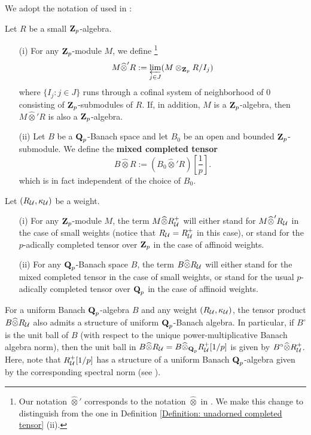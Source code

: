 We adopt the notation of  used in \cite{CHJ-2017}:

\begin{Definition}\label{Definition: unadorned completed tensor}
Let $R$ be a small $\operatorname{\mathbf{Z}}_p$-algebra.
\begin{enumerate}
\item[(i)] For any $\operatorname{\mathbf{Z}}_p$-module $M$, we define \footnote{Our notation $\widehat{\otimes}'$ corresponds to the notation $\widehat{\otimes}$ in \cite[Definition 6.3]{CHJ-2017}. We make this change to distinguish from the one in Definition \ref{Definition: unadorned completed tensor} (ii).}
$$M\widehat{\otimes}' R:=\varprojlim _{j\in J} (M\otimes_{\operatorname{\mathbf{Z}}_p}R/I_j)$$
where $\{I_j: j\in J\}$ runs through a cofinal system of neighborhood of $0$ consisting of $\operatorname{\mathbf{Z}}_p$-submodules of $R$. If, in addition, $M$ is a $\operatorname{\mathbf{Z}}_p$-algebra, then $M\widehat{\otimes}' R$ is also a $\operatorname{\mathbf{Z}}_p$-algebra.
\item[(ii)] Let $B$ be a $\operatorname{\mathbf{Q}}_p$-Banach space and let $B_0$ be an open and bounded $\operatorname{\mathbf{Z}}_p$-submodule. We define the \textbf{mixed completed tensor}
$$B\widehat{\otimes}R:=(B_0\widehat{\otimes}'R)[\frac{1}{p}].$$
which is in fact independent of the choice of $B_0$. 
\end{enumerate}
\end{Definition}

\begin{Definition}\label{Definition: mixed completed tensor}
Let $(R_{\operatorname{\mathcal{U}}}, \kappa_{\operatorname{\mathcal{U}}})$ be a weight.
\begin{enumerate}
\item[(i)] For any $\operatorname{\mathbf{Z}}_p$-module $M$, the term $M\widehat{\otimes}R^+_{\operatorname{\mathcal{U}}}$ will either stand for $M\widehat{\otimes}' R_{\operatorname{\mathcal{U}}}$ in the case of small weights (notice that $R_{\operatorname{\mathcal{U}}}=R^+_{\operatorname{\mathcal{U}}}$ in this case), or stand for the $p$-adically completed tensor over $\operatorname{\mathbf{Z}}_p$ in the case of affinoid weights.
\item[(ii)]
For any $\operatorname{\mathbf{Q}}_p$-Banach space $B$, the term $B\widehat{\otimes} R_{\operatorname{\mathcal{U}}}$ will either stand for the mixed completed tensor in the case of small weights, or stand for the usual $p$-adically completed tensor over $\operatorname{\mathbf{Q}}_p$ in the case of affinoid weights. 
\end{enumerate}
\end{Definition}

\begin{Remark}\label{Remark: uniform Banach algebra structure 1}\normalfont 
For a uniform Banach $\operatorname{\mathbf{Q}}_p$-algebra $B$ and any weight $(R_{\operatorname{\mathcal{U}}}, \kappa_{\operatorname{\mathcal{U}}})$, the tensor product $B\widehat{\otimes}R_{\operatorname{\mathcal{U}}}$ also admits a structure of uniform $\operatorname{\mathbf{Q}}_p$-Banach algebra. In particular,
if $B^{\circ}$ is the unit ball of $B$ (with respect to the unique power-multiplicative Banach algebra norm), then the unit ball in $B\widehat{\otimes}R_{\operatorname{\mathcal{U}}} = B\widehat{\otimes}_{\operatorname{\mathbf{Q}}_p}R_{\operatorname{\mathcal{U}}}^+[1/p]$ is given by $B^{\circ}\widehat{\otimes} R^+_{\operatorname{\mathcal{U}}}$. Here, note that $R_{\operatorname{\mathcal{U}}}^+[1/p]$ has a structure of a uniform Banach $\operatorname{\mathbf{Q}}_p$-algebra given by the corresponding spectral norm (see \cite[pp. 202]{CHJ-2017}).
\end{Remark}

